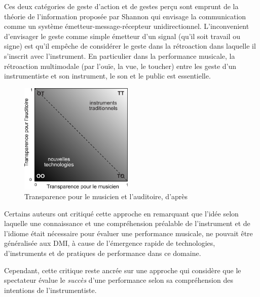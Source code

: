 Ces deux catégories de geste d'action et de gestes perçu sont emprunt de la théorie de l'information proposée par Shannon \cite{shannon_mathematical_1948} qui envisage la communication comme un système émetteur-message-récepteur unidirectionnel. 
L'inconvenient d'envisager le geste comme simple émetteur d'un signal (qu'il soit travail ou signe) est qu'il empêche de considérer le geste dans la rétroaction dans laquelle il s'inscrit avec l'instrument. En particulier dans la performance musicale, la rétroaction multimodale (par l'ouïe, la vue, le toucher) entre les geste d'un instrumentiste et son instrument, le son et le public est essentielle.








\begin{figure}
	\begin{center}
 		\includegraphics[width=0.48\textwidth]{gfx/03_gesture/Fels-transparency.pdf}
	\end{center}
	\caption{Transparence pour le musicien et l'auditoire, d'après \cite{fels_mapping_2002}}
	\label{fig:gesture:fels_transparency}
\end{figure}

Certains auteurs ont critiqué cette approche \cite{fyans_where_2009} en remarquant que l'idée selon laquelle une connaissance et une compréhension préalable de l'instrument et de l'idiome était nécessaire pour évaluer une performance musicale, ne pouvait être généralisée aux DMI, à cause de l'émergence rapide de technologies, d'instruments et de pratiques de performance dans ce domaine. 

Cependant, cette critique reste ancrée sur une approche qui considère que le spectateur évalue le \textit{succès} d'une performance selon sa compréhension des intentions de l'instrumentiste.


